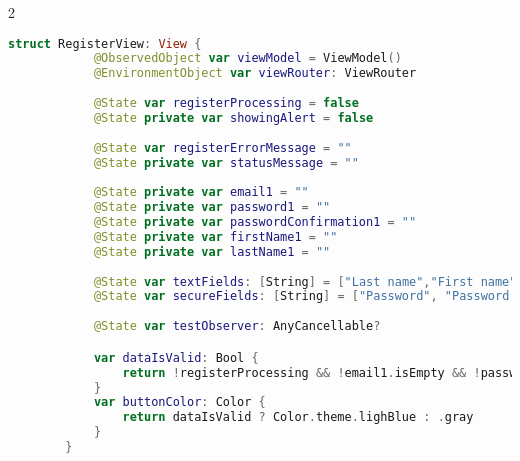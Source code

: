 \begin{spacing}{2}
\end{spacing}
\begin{minipage}{\textwidth}
    \linespread{0.8}\selectfont
    \begin{lstlisting}[language=swift]
        struct RegisterView: View {
            @ObservedObject var viewModel = ViewModel()
            @EnvironmentObject var viewRouter: ViewRouter
            
            @State var registerProcessing = false
            @State private var showingAlert = false
            
            @State var registerErrorMessage = ""
            @State private var statusMessage = ""
            
            @State private var email1 = ""
            @State private var password1 = ""
            @State private var passwordConfirmation1 = ""
            @State private var firstName1 = ""
            @State private var lastName1 = ""
            
            @State var textFields: [String] = ["Last name","First name","Email"]
            @State var secureFields: [String] = ["Password", "Password confirmation"]
            
            @State var testObserver: AnyCancellable?

            var dataIsValid: Bool {
                return !registerProcessing && !email1.isEmpty && !password1.isEmpty && !passwordConfirmation1.isEmpty && password1 == passwordConfirmation1
            }
            var buttonColor: Color {
                return dataIsValid ? Color.theme.lighBlue : .gray
            }
        }
    \end{lstlisting}   
\end{minipage}

